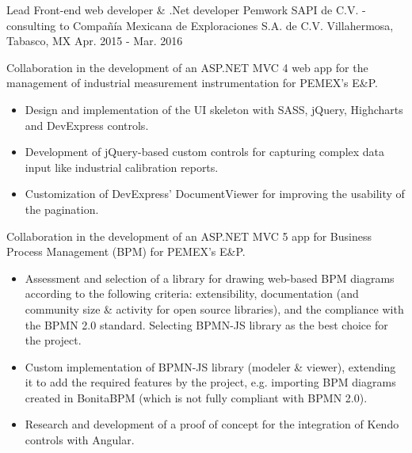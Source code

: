 \begin{cventries}
\cventry
{Lead Front-end web developer \& .Net developer} %
{Pemwork SAPI de C.V. - consulting to Compañía Mexicana de Exploraciones S.A. de C.V.} %
{Villahermosa, Tabasco, MX} %
{Apr. 2015 - Mar. 2016} %
{ %
	\begin{cvitems}
		\item{Collaboration in the development of an ASP.NET MVC 4 web app for the management of industrial measurement instrumentation for PEMEX's E\&P.}
		\begin{itemize}
			\item{Design and implementation of the UI skeleton with SASS, jQuery, Highcharts and DevExpress controls.}
			\item{Development of jQuery-based custom controls for capturing complex data input like industrial calibration reports.}
			\item{Customization of DevExpress' DocumentViewer for improving the usability of the pagination.}
		\end{itemize}		
		\item{Collaboration in the development of an ASP.NET MVC 5 app for Business Process Management (BPM) for PEMEX's E\&P.}
		\begin{itemize}
			\item{Assessment and selection of a library for drawing web-based BPM diagrams according to the following criteria: extensibility, documentation (and community size \& activity for open source libraries), and the compliance with the BPMN 2.0 standard. Selecting BPMN-JS library as the best choice for the project.}
			\item{Custom implementation of BPMN-JS library (modeler \& viewer), extending it to add the required features by the project, e.g. importing BPM diagrams created in BonitaBPM (which is not fully compliant with BPMN 2.0).}
			\item{Research and development of a proof of concept for the integration of Kendo controls with Angular.}
		\end{itemize}
	\end{cvitems}
}



\end{cventries}

